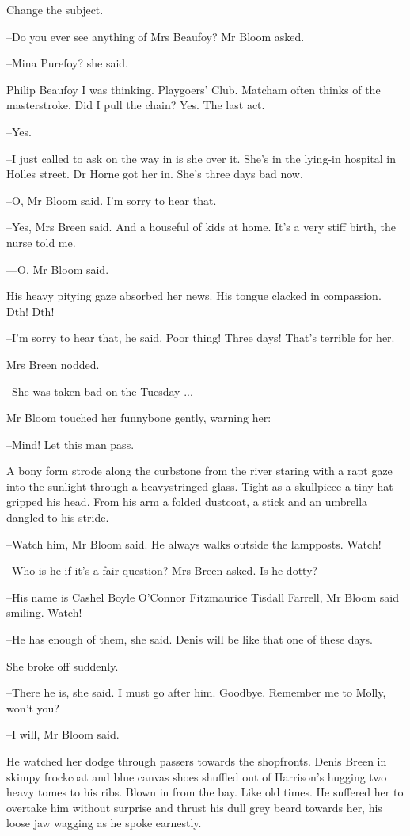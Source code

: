 Change the subject.

--Do you ever see anything of Mrs Beaufoy? Mr Bloom asked.

--Mina Purefoy? she said.

Philip Beaufoy I was thinking. Playgoers' Club. Matcham often
thinks of the masterstroke. Did I pull the chain? Yes. The last act.

--Yes.

--I just called to ask on the way in is she over it. She's in the lying-in
hospital in Holles street. Dr Horne got her in. She's three days bad now.

--O, Mr Bloom said. I'm sorry to hear that.

--Yes, Mrs Breen said. And a houseful of kids at home. It's a very stiff
birth, the nurse told me.

---O, Mr Bloom said.

His heavy pitying gaze absorbed her news. His tongue clacked in
compassion. Dth! Dth!

--I'm sorry to hear that, he said. Poor thing! Three days! That's terrible
for her.

Mrs Breen nodded.

--She was taken bad on the Tuesday ...

Mr Bloom touched her funnybone gently, warning her:

--Mind! Let this man pass.

A bony form strode along the curbstone from the river staring with a
rapt gaze into the sunlight through a heavystringed glass. Tight as a
skullpiece a tiny hat gripped his head. From his arm a folded dustcoat, a
stick and an umbrella dangled to his stride.

--Watch him, Mr Bloom said. He always walks outside the lampposts. Watch!

--Who is he if it's a fair question? Mrs Breen asked. Is he dotty?

--His name is Cashel Boyle O'Connor Fitzmaurice Tisdall Farrell, Mr
Bloom said smiling. Watch!

--He has enough of them, she said. Denis will be like that one of these
days.

She broke off suddenly.

--There he is, she said. I must go after him. Goodbye. Remember me to
Molly, won't you?

--I will, Mr Bloom said.

He watched her dodge through passers towards the shopfronts. Denis
Breen in skimpy frockcoat and blue canvas shoes shuffled out of Harrison's
hugging two heavy tomes to his ribs. Blown in from the bay. Like old
times. He suffered her to overtake him without surprise and thrust his
dull grey beard towards her, his loose jaw wagging as he spoke earnestly.


